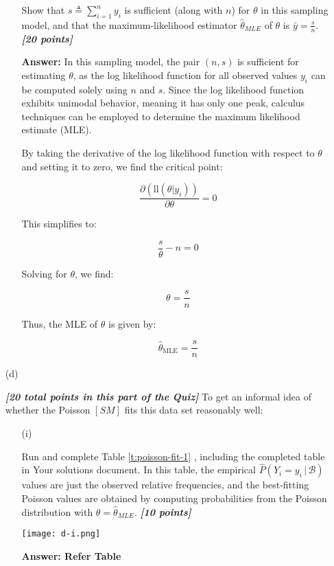 \documentclass[12pt]{article}
\newcommand{\given}{\, | \,}
\newcommand{\bi}[1]{\b{\i{#1}}}
\renewcommand{\b}[1]{\textbf{#1}}
\renewcommand{\i}[1]{\textit{#1}}
\renewcommand{\t}[1]{\texttt{#1}}
\begin{document}
\begin{itemize}
\begin{itemize}
Show that $s \triangleq \sum_{ i = 1 }^n y_i$ is sufficient (along with $n$) for $\theta$ in this sampling model, and that the maximum-likelihood estimator $\hat{ \theta }_{ MLE }$ of $\theta$ is $\bar{ y } = \frac{ s }{ n }$. \bi{[20 points]}

{\color{blue} \textbf{Answer:}
In this sampling model, the pair \((n, s)\) is sufficient for estimating \(\theta\), as the log likelihood function for all observed values \(y_i\) can be computed solely using \(n\) and \(s\). Since the log likelihood function exhibits unimodal behavior, meaning it has only one peak, calculus techniques can be employed to determine the maximum likelihood estimate (MLE).

By taking the derivative of the log likelihood function with respect to \(\theta\) and setting it to zero, we find the critical point:

\[ \frac{\partial (\text{ll}(\theta|y_i))}{\partial\theta} = 0 \]

This simplifies to:

\[ \frac{s}{\theta} - n = 0 \]

Solving for \(\theta\), we find:

\[ \theta = \frac{s}{n} \]

Thus, the MLE of \(\theta\) is given by:

\[ \hat{\theta}_{\text{MLE}} = \frac{s}{n} \]

}
\end{itemize}


\item[(d)]

\bi{[20 total points in this part of the Quiz]} To get an informal idea of whether the Poisson $[SM]$ fits this data set reasonably well:

\begin{itemize}

\item[(i)] 

Run \fbox{\t{Code Block 3}} and complete Table \ref{t:poisson-fit-1} , including the completed table in Your solutions document. In this table, the empirical $\hat{ P } ( Y_i = y_i \given \mathcal{ B } )$ values are just the observed relative frequencies, and the best-fitting Poisson values are obtained by computing probabilities from the Poisson distribution with $\theta = \hat{ \theta }_{ MLE }$. \bi{[10 points]}

\texttt{[image: d-i.png]}

{\color{blue} \textbf{Answer: Refer Table}}
\begin{table}[t!]


\end{table}
\end{itemize}
\end{itemize}
\end{document}
